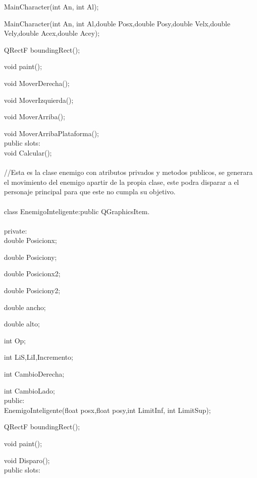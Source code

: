 \documentclass{article}
\begin{document}
    MainCharacter(int An, int Al);
    
    MainCharacter(int An, int Al,double Posx,double Posy,double Velx,double Vely,double Acex,double Acey);
    
    QRectF boundingRect();
    
    void paint();
    
    void MoverDerecha();
    
    void MoverIzquierda();
    
    void MoverArriba();
    
    void MoverArribaPlataforma();\\
    
public slots:\\

    void Calcular();\\
\rbrace\\

//Esta es la clase enemigo con atributos privados y metodos publicos, se generara el movimiento del enemigo apartir de la propia clase, este podra disparar a el personaje principal para que este no cumpla su objetivo.\\
\\
class EnemigoInteligente:public QGraphicsItem.\\
\lbrace\\
private:\\

    double Posicionx;
    
    double Posiciony;
    
    double Posicionx2;
    
    double Posiciony2;
    
    double ancho;
    
    double alto;
    
    int Op;
    
    int LiS,LiI,Incremento;
    
    int CambioDerecha;
    
    int CambioLado;\\
public:\\

    EnemigoInteligente(float posx,float posy,int LimitInf, int LimitSup);

    QRectF boundingRect();
    
    void paint();
    
    void Disparo();\\
public slots:\\
\end{document}
